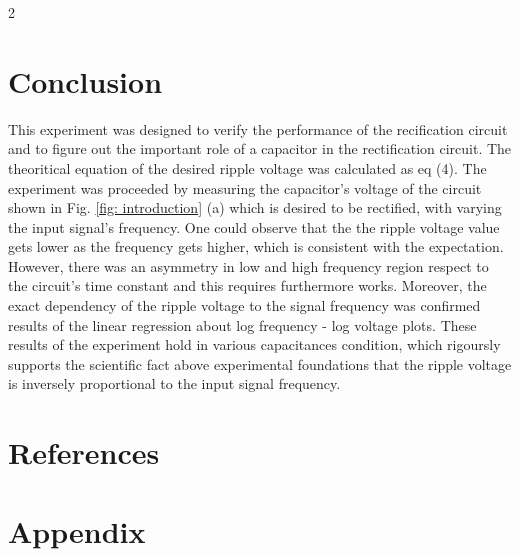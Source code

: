 \documentclass{article}
\begin{document}
\begin{multicols}{2}
\section{Conclusion}
This experiment was designed to verify the performance of the recification circuit and to figure out the important role of a capacitor in the rectification circuit. 
The theoritical equation of the desired ripple voltage was calculated as eq (4). 
The experiment was proceeded by measuring the capacitor's voltage of the circuit shown in Fig. \ref{fig: introduction} (a) which is desired to be rectified, with varying the input signal's frequency.
One could observe that the the ripple voltage value gets lower as the frequency gets higher, which is consistent with the expectation.
However, there was an asymmetry in low and high frequency region respect to the circuit's time constant and this requires furthermore works. 
Moreover, the exact dependency of the ripple voltage to the signal frequency was confirmed results of the linear regression about log frequency - log voltage plots. 
These results of the experiment hold in various capacitances condition, which rigoursly supports the scientific fact above experimental foundations that the ripple voltage is inversely proportional to the input signal frequency. 

\section{References}
 

\end{multicols}
\newpage

\section{Appendix}
\end{document}
